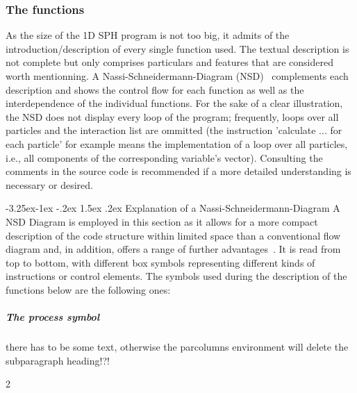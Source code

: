 \documentclass{report}
\makeatletter
\renewcommand\paragraph{\@startsection{paragraph}{4}{\z@}%
  {-3.25ex\@plus -1ex \@minus -.2ex}%
  {1.5ex \@plus .2ex}%
  {\normalfont\normalsize\bfseries}}
\makeatother
\begin{document}
\subsubsection{The functions}

As the size of the 1D SPH program is not too big, it admits of the 
introduction/description of every single function used. The textual description is not complete but only comprises particulars and features that are considered worth mentionning. A Nassi-Schneidermann-Diagram (NSD)~\cite{Nassi1973} complements each description and shows the control flow for each function as well as the interdependence of the individual functions. For the sake of a clear illustration, the NSD does not display every loop of the program; frequently, loops over all particles and the interaction list are ommitted (the instruction 'calculate ... for each particle' for example means the implementation of a loop over all particles, i.e., all components of the corresponding variable's vector).  Consulting the comments in the source code is recommended if a more detailed understanding is necessary or desired.

\paragraph{Explanation of a Nassi-Schneidermann-Diagram}
A NSD Diagram is employed in this section as it allows for a more compact description of the code structure within limited space than a conventional flow diagram and, in addition, offers a range of further advantages~\cite{Nassi1973}. It is read from top to bottom, with different box symbols representing different kinds of instructions or control elements. The symbols used during the description of the functions below are the following ones:

\subparagraph{The process symbol}
there has to be some text, otherwise the parcolumns environment will delete the subparagraph heading!?!
\vspace{5mm}
\begin{parcolumns} [colwidths={1=60mm,2=35mm}] {2}  
 

\colplacechunks
\end{parcolumns}
\end{document}
